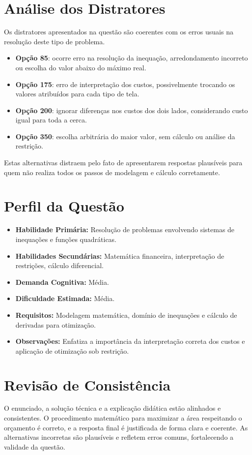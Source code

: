 \documentclass{article}
\begin{document}
\section{Análise dos Distratores}
Os distratores apresentados na questão são coerentes com os erros usuais na resolução deste tipo de problema.

\begin{itemize}
  \item \textbf{Opção 85}: ocorre erro na resolução da inequação, arredondamento incorreto ou escolha do valor abaixo do máximo real.
  \item \textbf{Opção 175}: erro de interpretação dos custos, possivelmente trocando os valores atribuídos para cada tipo de tela.
  \item \textbf{Opção 200}: ignorar diferenças nos custos dos dois lados, considerando custo igual para toda a cerca.
  \item \textbf{Opção 350}: escolha arbitrária do maior valor, sem cálculo ou análise da restrição.
\end{itemize}

Estas alternativas distraem pelo fato de apresentarem respostas plausíveis para quem não realiza todos os passos de modelagem e cálculo corretamente.

\section{Perfil da Questão}
\begin{itemize}
  \item \textbf{Habilidade Primária:} Resolução de problemas envolvendo sistemas de inequações e funções quadráticas.
  \item \textbf{Habilidades Secundárias:} Matemática financeira, interpretação de restrições, cálculo diferencial.
  \item \textbf{Demanda Cognitiva:} Média.
  \item \textbf{Dificuldade Estimada:} Média.
  \item \textbf{Requisitos:} Modelagem matemática, domínio de inequações e cálculo de derivadas para otimização.
  \item \textbf{Observações:} Enfatiza a importância da interpretação correta dos custos e aplicação de otimização sob restrição.
\end{itemize}

\section{Revisão de Consistência}
O enunciado, a solução técnica e a explicação didática estão alinhados e consistentes. O procedimento matemático para maximizar a área respeitando o orçamento é correto, e a resposta final é justificada de forma clara e coerente. As alternativas incorretas são plausíveis e refletem erros comuns, fortalecendo a validade da questão.
\end{document}
